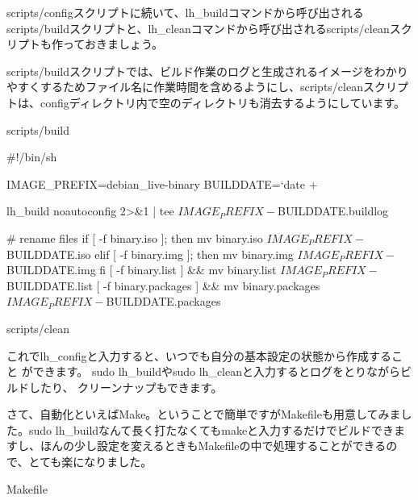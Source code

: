 \documentclass[mingoth,a4paper]{jsarticle}
\begin{document}
scripts/configスクリプトに続いて、lh\_buildコマンドから呼び出されるscripts/buildスクリプトと、lh\_cleanコマンドから呼び出されるscripts/cleanスクリプトも作っておきましょう。

scripts/buildスクリプトでは、ビルド作業のログと生成されるイメージをわかりやすくするためファイル名に作業時間を含めるようにし、scripts/cleanスクリプトは、configディレクトリ内で空のディレクトリも消去するようにしています。

scripts/build

\begin{commandline}
#!/bin/sh

IMAGE_PREFIX=debian_live-binary
BUILDDATE=`date +%

lh_build noautoconfig 2>&1 | tee ${IMAGE_PREFIX}-${BUILDDATE}.buildlog

# rename files
if [ -f binary.iso ]; then
   mv binary.iso ${IMAGE_PREFIX}-${BUILDDATE}.iso
elif [ -f binary.img ]; then
   mv binary.img ${IMAGE_PREFIX}-${BUILDDATE}.img
fi
[ -f binary.list ] && mv binary.list ${IMAGE_PREFIX}-${BUILDDATE}.list
[ -f binary.packages ] && mv binary.packages ${IMAGE_PREFIX}-${BUILDDATE}.packages
\end{commandline}

\newpage

scripts/clean


これでlh\_configと入力すると、いつでも自分の基本設定の状態から作成すること
ができます。
sudo lh\_buildやsudo lh\_cleanと入力するとログをとりながらビルドしたり、
クリーンナップもできます。

さて、自動化といえばMake。ということで簡単ですがMakefileも用意してみまし
た。sudo lh\_buildなんて長く打たなくてもmakeと入力するだけでビルドできま
すし、ほんの少し設定を変えるときもMakefileの中で処理することができるので、とても楽になりました。

Makefile
\end{document}
